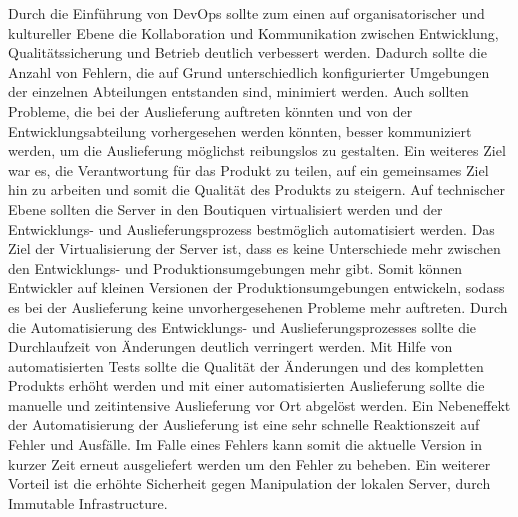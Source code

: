 Durch die Einführung von DevOps sollte zum einen auf organisatorischer und kultureller Ebene die Kollaboration und Kommunikation zwischen Entwicklung, Qualitätssicherung und Betrieb deutlich verbessert werden. Dadurch sollte die Anzahl von Fehlern, die auf Grund unterschiedlich konfigurierter Umgebungen der einzelnen Abteilungen entstanden sind, minimiert werden. Auch sollten Probleme, die bei der Auslieferung auftreten könnten und von der Entwicklungsabteilung vorhergesehen werden könnten, besser kommuniziert werden, um die Auslieferung möglichst reibungslos zu gestalten. Ein weiteres Ziel war es, die Verantwortung für das Produkt zu teilen, auf ein gemeinsames Ziel hin zu arbeiten und somit die Qualität des Produkts zu steigern. Auf technischer Ebene sollten die Server in den Boutiquen virtualisiert werden und der Entwicklungs- und Auslieferungsprozess bestmöglich automatisiert werden. Das Ziel der Virtualisierung der Server ist, dass es keine Unterschiede mehr zwischen den Entwicklungs- und Produktionsumgebungen mehr gibt. Somit können Entwickler auf kleinen Versionen der Produktionsumgebungen entwickeln, sodass es bei der Auslieferung keine unvorhergesehenen Probleme mehr auftreten. Durch die Automatisierung des Entwicklungs- und Auslieferungsprozesses sollte die Durchlaufzeit von Änderungen deutlich verringert werden. Mit Hilfe von automatisierten Tests sollte die Qualität der Änderungen und des kompletten Produkts erhöht werden und mit einer automatisierten Auslieferung sollte die manuelle und zeitintensive Auslieferung vor Ort abgelöst werden. Ein Nebeneffekt der Automatisierung der Auslieferung ist eine sehr schnelle Reaktionszeit auf Fehler und Ausfälle. Im Falle eines Fehlers kann somit die aktuelle Version in kurzer Zeit erneut ausgeliefert werden um den Fehler zu beheben. Ein weiterer Vorteil ist die erhöhte Sicherheit gegen Manipulation der lokalen Server, durch \glqq Immutable Infrastructure\grqq. \parencite[Vgl.][S. 5]{Reed:2014}\\

